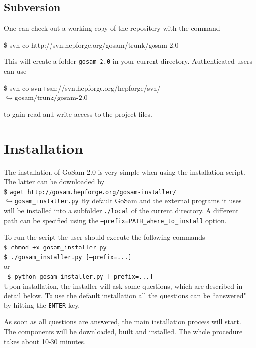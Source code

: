\documentclass[11pt,a4paper]{refrep}
\newcommand{\gosamversion}{{2{.}0}}
\newcommand{\gosam}{{\sc GoSam}\xspace}
\newcommand{\contl}{{\ensuremath{\hookrightarrow}}}
\newcommand{\bcen}{\begin{center}}
\newcommand{\ecen}{\end{center}}
\begin{document}
\subsection*{Subversion}
One can check-out a working copy of the repository with the command
\begin{example}
\$ svn co http://svn.hepforge.org/gosam/trunk/gosam-\gosamversion{}
\end{example}
This will create a folder \texttt{gosam-\gosamversion} in your current directory.
Authenticated users can use 
\begin{example}
\$ svn co svn+ssh://svn.hepforge.org/hepforge/svn/\\
   \contl{}gosam/trunk/gosam-\gosamversion{}
\end{example}
to gain read and write access to the project files.


\section{Installation}

The installation of \gosam-\gosamversion{} is very simple when using the installation script.
The latter can be downloaded by\\
\$   {\tt wget  http://gosam.hepforge.org/gosam-installer/}\\
\contl{}{\tt gosam\_installer.py}
By default \gosam{} and the external programs it uses  will be 
installed into a subfolder {\tt ./local}
of the current directory. A different path can be specified 
using the {\tt --prefix=PATH\_where\_to\_install} option.

\noindent To run the script the user should execute the following commands\\
{\tt \$  chmod +x gosam\_installer.py\\
     \$  ./gosam\_installer.py     [--prefix=...]
}\\ 
 or\\
{\tt           
\$ python gosam\_installer.py   [--prefix=...]
}\\
Upon installation, the installer will ask some questions, which are described in 
detail below. To use the default installation all the questions can 
be ``answered" by hitting the {\tt ENTER} key.

As soon as all questions are answered, the main installation process will start. 
The components will be downloaded, built and installed. 
The whole procedure takes about 10-30 minutes.
\end{document}
